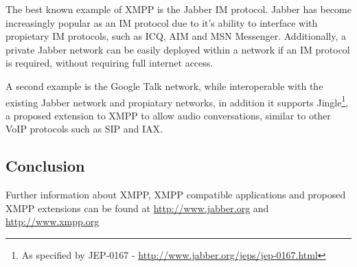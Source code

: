 The best known example of XMPP is the Jabber IM protocol. Jabber has
become increasingly popular as an IM protocol due to it's ability to
interface with propietary IM protocols, such as ICQ, AIM and MSN
Messenger. Additionally, a private Jabber network can be easily 
deployed within a network if an IM protocol is required, without 
requiring full internet access. 


A second example is the Google Talk network, while interoperable with
the existing Jabber network and propiatary networks, in addition it
supports Jingle\footnote{As specified by JEP-0167 - \url{http://www.jabber.org/jeps/jep-0167.html}},
a proposed extension to XMPP to allow audio conversations, similar to
other VoIP protocols such as SIP and IAX.

\subsection{Conclusion}

Further information about XMPP, XMPP compatible applications and
proposed XMPP extensions can be found at \url{http://www.jabber.org} and
\url{http://www.xmpp.org}
